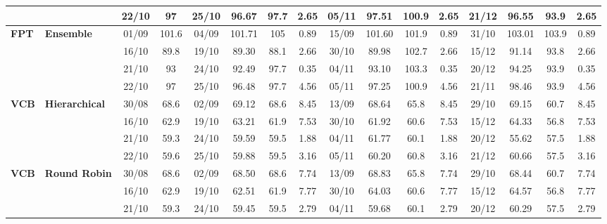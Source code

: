 \documentclass{ieeeaccess}
\begin{document}
\begin{table}[!h]
\begin{tabular}{llcc|cccc|cccc|cccc}
&
& 22/10 & 97 & 25/10 & 96.67 & 97.7 & 2.65 & 05/11 & 97.51 & 100.9 & 2.65 & 21/12 & 96.55 & 93.9 & 2.65 \\
\midrule



\multirow{4}{*}{\textbf{FPT}} 
& \textbf{Ensemble}
& 01/09 & 101.6 & 04/09 & 101.71 & 105 & 0.89 & 15/09 & 101.60 & 101.9 & 0.89 & 31/10 & 103.01 & 103.9 & 0.89 \\

&
& 16/10 & 89.8 & 19/10 & 89.30 & 88.1 & 2.66 & 30/10 & 89.98 & 102.7 & 2.66 & 15/12 & 91.14 & 93.8 & 2.66 \\

&
& 21/10 & 93 & 24/10 & 92.49 & 97.7 & 0.35 & 04/11 & 93.10 & 103.3 & 0.35 & 20/12 & 94.25 & 93.9 & 0.35 \\

&
& 22/10 & 97 & 25/10 & 96.48 & 97.7 & 4.56 & 05/11 & 97.25 & 100.9 & 4.56 & 21/11 & 98.46 & 93.9 & 4.56 \\
\midrule




\multirow{4}{*}{\textbf{VCB}} 
& \textbf{Hierarchical}
& 30/08 & 68.6 & 02/09 & 69.12 & 68.6 & 8.45 & 13/09 & 68.64 & 65.8 & 8.45 & 29/10 & 69.15 & 60.7 & 8.45 \\

&
& 16/10 & 62.9 & 19/10 & 63.21 & 61.9 & 7.53 & 30/10 & 61.92 & 60.6 & 7.53 & 15/12 & 64.33 & 56.8 & 7.53 \\

&
& 21/10 & 59.3 & 24/10 & 59.59 & 59.5 & 1.88 & 04/11 & 61.77 & 60.1 & 1.88 & 20/12 & 55.62 & 57.5 & 1.88 \\

&
& 22/10 & 59.6 & 25/10 & 59.88 & 59.5 & 3.16 & 05/11 & 60.20 & 60.8 & 3.16 & 21/12 & 60.66 & 57.5 & 3.16 \\
\midrule


\multirow{4}{*}{\textbf{VCB}} 
& \textbf{Round Robin}
& 30/08 & 68.6 & 02/09 & 68.50 & 68.6 & 7.74 & 13/09 & 68.83 & 65.8 & 7.74 & 29/10 & 68.44 & 60.7 & 7.74 \\

&
& 16/10 & 62.9 & 19/10 & 62.51 & 61.9 & 7.77 & 30/10 & 64.03 & 60.6 & 7.77 & 15/12 & 64.57 & 56.8 & 7.77 \\

&
& 21/10 & 59.3 & 24/10 & 59.45 & 59.5 & 2.79 & 04/11 & 59.68 & 60.1 & 2.79 & 20/12 & 60.29 & 57.5 & 2.79 \\


\end{tabular}
\end{table}
\end{document}
